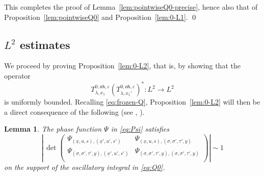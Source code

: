 \documentclass[leqno]{amsart}
\newtheorem{lemma}[theorem]{Lemma}
\theoremstyle{definition}
\theoremstyle{remark}
\numberwithin{equation}{section}
\begin{document}
This completes the proof of Lemma~\ref{lem:pointwiseQ0-precise}, hence also that of Proposition~\ref{lem:pointwiseQ0} and Proposition~\ref{lem:0-L1}.
\qed

\subsection{$L^2$ estimates}
We proceed by proving Proposition~\ref{lem:0-L2}, that is, by showing  that the operator
\[
{T_{\lambda,x_1}^{0,\mathsf{nh},\varepsilon} (T_{\lambda,x_1'}^{0,\mathsf{nh},\varepsilon} )^*}:L^2\to L^2
\]
is  uniformly  bounded. Recalling \eqref{eq:frozen-Q}, Proposition~\ref{lem:0-L2} will then be a direct consequence of the following (see \cite{Hoermander-Acta1971},  \cite{GreenleafSeeger-Escorial}). 


\begin{lemma}\label{lem:0-det}
The phase function $\Psi$ in \eqref{eq:Psi} satisfies
\[
\left|
\, \det\begin{pmatrix}
\Psi_{(\underline x, u,s),(\underline x', u',s')} & \Psi_{(\underline x, u,s),(\sigma,\sigma',\tau',y)}\\
\Psi_{(\sigma,\sigma',\tau',y),(\underline x', u',s')} & \Psi_{(\sigma,\sigma',\tau',y),(\sigma,\sigma',\tau',y)}\\
\end{pmatrix} 
\right|
\sim 1
\]
on the support of the oscillatory integral in \eqref{eq:Q0}.
\end{lemma}
\end{document}
